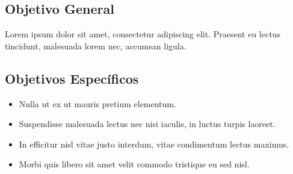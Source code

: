 \subsection*{Objetivo General}
Lorem ipsum dolor sit amet, consectetur adipiscing elit. Praesent eu lectus tincidunt, malesuada lorem nec, accumsan ligula.

\subsection*{Objetivos Específicos}
\begin{itemize}
\item Nulla ut ex ut mauris pretium elementum.
\item Suspendisse malesuada lectus nec nisi iaculis, in luctus turpis laoreet.
\item In efficitur nisl vitae justo interdum, vitae condimentum lectus maximus.
\item Morbi quis libero sit amet velit commodo tristique eu sed nisl.
\end{itemize}